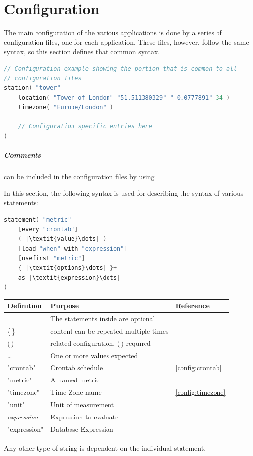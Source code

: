 \chapter{Configuration}

The main configuration of the various applications is done by a series of configuration files, one for each application.
These files, however, follow the same syntax, so this section defines that common syntax.

\begin{lstlisting}[caption={Example configuration file},language=Go]
// Configuration example showing the portion that is common to all
// configuration files
station( "tower"
    location( "Tower of London" "51.511380329" "-0.0777891" 34 )
    timezone( "Europe/London" )

    // Configuration specific entries here
)
\end{lstlisting}

\paragraph{Comments} can be included in the configuration files by using \SyntaxDefinition{//}

\label{sec:config:reference}

In this section, the following syntax is used for describing the syntax of various statements:

\begin{lstlisting}[language=Go,style=kaolstplain,escapechar=|]
statement( "metric"
    [every "crontab"]
    ( |\textit{value}\dots| )
    [load "when" with "expression"]
    [usefirst "metric"]
    { |\textit{options}\dots| }+
    as |\textit{expression}\dots|
)
\end{lstlisting}

\begin{table}[h!]
    \begin{tabular}{l l l}
        \toprule
        Definition & Purpose & Reference \\
        \midrule
        \text{[\,]} & The statements inside are optional} & \\
        \{\,\}+ & content can be repeated multiple times & \\
        (\,) & related configuration, (\,) required} & \\
        \dots & One or more values expected} & \\
        "crontab" & Crontab schedule & \vref{config:crontab}} \\
        "metric" & A named metric & \\
        "timezone" & Time Zone name & \vref{config:timezone}} \\
        "unit" & Unit of measurement & \\
        \textit{expression} & Expression to evaluate & \\
        "expression" & Database Expression & \\
        \bottomrule
    \end{tabular}
\end{table}

Any other type of string is dependent on the individual statement.

\clearpage








